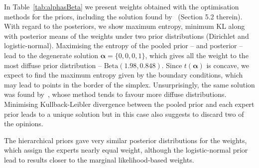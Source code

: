 \documentclass[a4paper, notitlepage, 11pt]{article}
\begin{document}
In Table~\ref{tab:alphasBeta} we present weights obtained with the optimisation methods for the priors, including the solution found by~\cite{Rufo2012B} (Section 5.2 therein).
With regard to the posteriors, we show maximum entropy, minimum KL along with posterior means of the weights under two prior distributions (Dirichlet and logistic-normal).
Maximising the entropy of the pooled prior -- and posterior -- lead to the degenerate solution $\boldsymbol \alpha = \{0, 0, 0, 1 \}$, which gives all the weight to the most diffuse prior distribution -- $\text{Beta}(1.98, 0.848)$.
Since $t(\boldsymbol\alpha)$ is concave, we expect to find the maximum entropy given by the boundary conditions, which may lead to points in the border of the simplex.
Unsurprisingly, the same solution was found by~\cite{Rufo2012B}, whose method tends to favour more diffuse distributions.
Minimising Kullback-Leibler divergence between the pooled prior and each expert prior leads to a unique solution but in this case also suggests to discard two of the opinions.

The hierarchical priors gave very similar posterior distributions for the weights, which assign the experts nearly equal weight, although the logistic-normal prior lead to results closer to the marginal likelihood-based weights.
\end{document}
